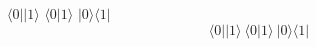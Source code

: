 \documentclass[12pt]{article}
\newcommand{\q}[1]{|#1\rangle}
\newcommand{\tq}[1]{$|#1\rangle$}
\newcommand{\qa}[1]{\langle#1|}
\newcommand{\tqa}[1]{$\langle#1|$}
\newcommand{\ip}[2]{\langle#1|#2\rangle}
\newcommand{\tip}[2]{$\langle#1|#2\rangle$}
\newcommand{\op}[2]{\q{#1}\qa{#2}}
\renewcommand{\top}[2]{\tq{#1}\tqa{#2}}
\begin{document}
\tqa{0}\tq{1} \tip{0}{1} \top{0}{1}
\[\qa{0}\q{1}~\ip{0}{1}~\op{0}{1}\]
\end{document}

